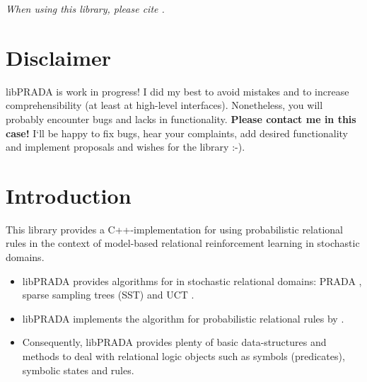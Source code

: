 \documentclass[10pt,twoside,twocolumn,fleqn]{article}
\begin{document}
\maketitle

\begin{center}
\emph{When using this library, please cite \citet{lang-toussaint-10jair}.}
\end{center}

\tableofcontents





\section{Disclaimer}

libPRADA is work in progress! I did my best to avoid mistakes and to increase
comprehensibility (at least at high-level interfaces). Nonetheless, you
will probably encounter bugs and lacks in functionality. \textbf{Please contact
me in this case!} I`ll be happy to fix bugs, hear your complaints, add
desired functionality and implement proposals and wishes for the library :-).



\section{Introduction}

This library provides a C++-implementation for using probabilistic
relational rules in the context of model-based relational reinforcement
learning in stochastic domains.
\begin{itemize}
\item libPRADA provides algorithms for  in stochastic
relational domains: PRADA \cite{lang-toussaint-10jair}, sparse sampling
trees (SST) \cite{kearns02ss} and UCT \cite{kocsis06uct}.

\item libPRADA implements the algorithm for 
probabilistic relational rules by \citet{pasula07ai}.

\item Consequently, libPRADA provides plenty of basic data-structures
and methods to deal with relational logic objects such as
symbols (predicates), symbolic states and rules.
\end{itemize}
\end{document}
